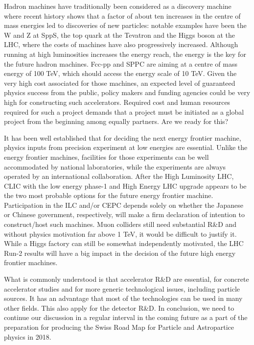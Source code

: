 \noindent Hadron machines have traditionally been considered as a discovery machine where recent history shows that a factor of about ten increases in the centre of mass energies led to discoveries of new particles: notable examples have been the  W and Z at SppS, the top quark at the Tevatron and the Higgs boson at the LHC, where the costs of machines have also progressively increased. Although running at high luminosities increases the energy reach, the energy is the key for the future hadron machines. Fcc-pp and SPPC are aiming at a centre of mass energy of 100 TeV, which should access the energy scale of 10 TeV. Given the very high cost associated for those machines, an expected level of guaranteed physics success from the public, policy makers and funding agencies could be very high for constructing such accelerators. Required cost and human resources required for such a project demands that a project must be initiated as a global project from the beginning among equally partners. Are we ready for this? 

\medskip 

\noindent It has been well established that for deciding the next energy frontier machine, physics inputs from precision experiment at low energies are essential. Unlike the energy frontier machines, facilities for those experiments can be well accommodated by national laboratories, while the experiments are always operated by an international collaboration.  After the High Luminosity LHC, CLIC with the low energy phase-1 and High Energy LHC upgrade appears to be the two most probable options for the future energy frontier machine. Participation in the ILC and/or CEPC depends solely on whether the Japanese or Chinese government, respectively, will make a firm declaration of intention to construct/host such machines. Muon colliders still need substantial R\&D and without physics motivation far above 1 TeV, it would be difficult to justify it. While a Higgs factory can still be somewhat independently motivated, the LHC Run-2 results will have a big impact in the decision of the future high energy frontier machines. 
\medskip

\noindent What is commonly understood is that  accelerator R\&D are essential, for concrete accelerator studies and for more generic technological issues, including particle sources. It has an advantage that most of the technologies can be used in many other fields. This also apply for the detector R\&D.  In conclusion, we need to continue our discussion in a regular interval in the coming future as a part of the preparation for producing the Swiss Road Map for Particle and Astropartice physics in 2018.

